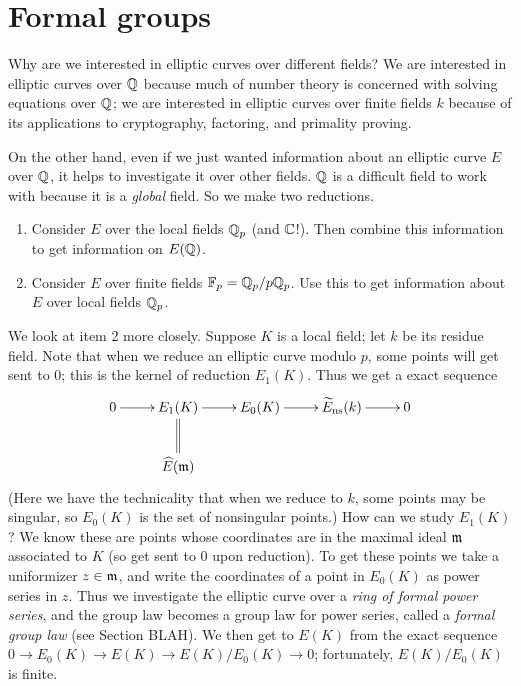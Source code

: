 \chapter{Formal groups}

Why are we interested in elliptic curves over different fields? We are interested in elliptic curves over $\mathbb{Q}$ because much of number theory is concerned with solving equations over $\mathbb{Q}$; we are interested in elliptic curves over finite fields $k$ because of its applications to cryptography, factoring, and primality proving.

On the other hand, even if we just wanted information about an elliptic curve $E$ over $\mathbb{Q}$, it helps to investigate it over other fields. $\mathbb{Q}$ is a difficult field to work with because it is a {\it global} field. So we make two reductions.
\begin{enumerate}
\item Consider $E$ over the local fields $\mathbb{Q}_p$ (and $\mathbb{C}$!). Then combine this information to get information on $E(\mathbb{Q})$.
\item Consider $E$ over finite fields $\mathbb{F}_p=\mathbb{Q}_p/p\mathbb{Q}_p$. Use this to get information about $E$ over local fields $\mathbb{Q}_p$.
\end{enumerate}
We look at item 2 more closely. Suppose $K$ is a local field; let $k$ be its residue field. 
Note that when we reduce an elliptic curve modulo $p$, some points will get sent to 0; this is the kernel of reduction $E_1(K)$. Thus we get a exact sequence
\[
\xymatrix{
0\ar[r]& E_1(K)\ar[r]&  E_0(K)\ar[r]&  \wt{E}_{\text{ns}}(k)\ar[r]&  0\\%
& \wh{E}(\mm)\ar@{=}[u] &  & &}
\]
(Here we have the technicality that when we reduce to $k$, some points may be singular, so $E_0(K)$ is the set of nonsingular points.)
How can we study $E_1(K)$? We know these are points whose coordinates are in the maximal ideal $\mathfrak{m}$ associated to $K$ (so get sent to 0 upon reduction). 
To get these points we take a uniformizer $z\in \mathfrak{m}$, and write the coordinates of a point in $E_0(K)$ as power series in $z$. Thus we investigate the elliptic curve over a {\it ring of formal power series}, and the group law becomes a group law for power series, called a {\it formal group law} (see Section BLAH). We then get to $E(K)$ from the exact sequence $0\to E_0(K)\to E(K)\to E(K)/E_0(K)\to 0$; fortunately, $E(K)/E_0(K)$ is finite.

